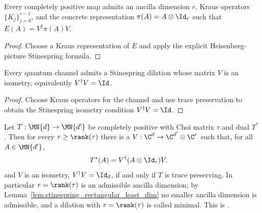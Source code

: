 \begin{theorem}
    \label{thm:exists_stinespring_dilation}
    \leanok
    Every completely positive map admits an ancilla dimension $r$, Kraus operators
    $\{K_j\}_{j=0}^{r-1}$, and the concrete representation
    $\pi(A)=A\otimes\Id_r$ such that $E(A)=V^\dagger\pi(A)V$.
\end{theorem}

\begin{proof}\leanok
    Choose a Kraus representation of $E$ and apply the explicit Heisenberg-picture
    Stinespring formula.
\end{proof}

\begin{theorem}
    \label{thm:exists_stinespring_isometry_of_cptp}
    \leanok
    Every quantum channel admits a Stinespring dilation whose matrix $V$ is an
    isometry, equivalently $V^\dagger V=\Id$.
\end{theorem}

\begin{proof}\leanok
    Choose Kraus operators for the channel and use trace preservation to obtain
    the Stinespring isometry condition $V^\dagger V=\Id$.
\end{proof}

\begin{theorem}
    \label{thm:stinespring_rectangular}
    \leanok
    Let $T:\MN{d}\to\MN{d'}$ be completely positive with Choi matrix $\tau$ and
    dual $T^*$. Then for every $r\geq\rank(\tau)$ there is a
    $V:\C^{d}\to\C^{d'}\otimes\C^{r}$ such that, for all $A\in\MN{d'}$,
    \begin{align}
        T^*(A)&=V^\dagger(A\otimes\Id_r)V,
        \label{eq:stinespring_rectangular}
    \end{align}
    and $V$ is an isometry, $V^\dagger V=\Id_d$, if and only if $T$ is trace
    preserving. In particular $r=\rank(\tau)$ is an admissible ancilla
    dimension; by Lemma~\ref{lem:stinespring_rectangular_least_dim} no smaller
    ancilla dimension is admissible, and a dilation with $r=\rank(\tau)$ is
    called minimal. This is \cite[Theorem~2.2]{Wolf2012Quantum}.
\end{theorem}

